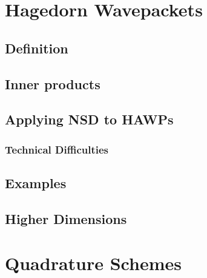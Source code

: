 \documentclass{beamer}
\begin{document}
\section{Hagedorn Wavepackets}
\subsection{Definition}


\subsection{Inner products}



\subsection{Applying NSD to HAWPs}
\subsubsection{Technical Difficulties}



\subsection{Examples}




\subsection{Higher Dimensions}





\section{Quadrature Schemes}
\end{document}
